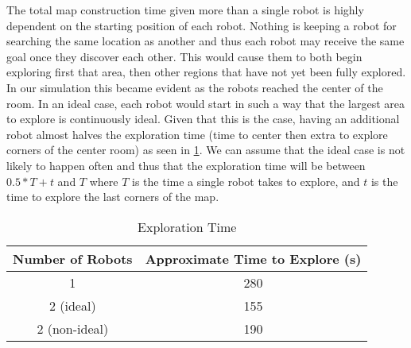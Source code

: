 \documentclass[11pt, conference]{IEEEtran}
\begin{document}
The total map construction time given more than a single robot is highly dependent on the starting position of each robot. Nothing is keeping a robot for searching the same location as another and thus each robot may receive the same goal once they discover each other. This would cause them to both begin exploring first that area, then other regions that have not yet been fully explored. In our simulation this became evident as the robots reached the center of the room. In an ideal case, each robot would start in such a way that the largest area to explore is continuously ideal. Given that this is the case, having an additional robot almost halves the exploration time (time to center then extra to explore corners of the center room) as seen in \ref{tab1}. We can assume that the ideal case is not likely to happen often and thus that the exploration time will be between $0.5*T + t$ and $T$ where $T$ is the time a single robot takes to explore, and $t$ is the time to explore the last corners of the map.

\begin{table}[htbp]
\caption{Exploration Time}
\begin{center}
\begin{tabular}{|c|c|}
\hline
\textbf{Number of Robots}&\textbf{Approximate Time to Explore (s)}\\
\hline
1& 280\\
\hline
2 (ideal)& 155\\
\hline
2 (non-ideal)& 190\\
\hline
\end{tabular}
\label{tab1}
\end{center}
\end{table}

\end{document}
